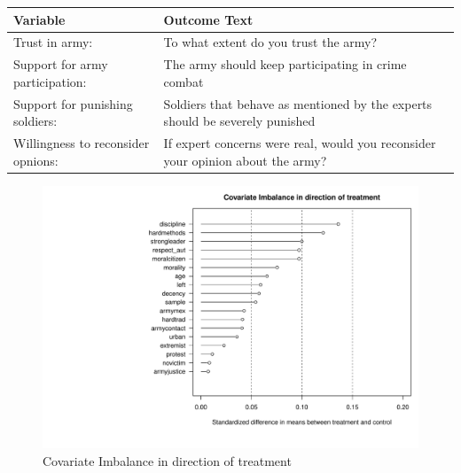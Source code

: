 \documentclass[
  12pt,
]{article}
\begin{document}
\begin{longtable}[]{@{}ll@{}}
\toprule
\begin{minipage}[b]{0.29\columnwidth}\raggedright
Variable\strut
\end{minipage} & \begin{minipage}[b]{0.65\columnwidth}\raggedright
Outcome Text\strut
\end{minipage}\tabularnewline
\midrule
\endhead
\begin{minipage}[t]{0.29\columnwidth}\raggedright
Trust in army:\strut
\end{minipage} & \begin{minipage}[t]{0.65\columnwidth}\raggedright
To what extent do you trust the army?\strut
\end{minipage}\tabularnewline
\begin{minipage}[t]{0.29\columnwidth}\raggedright
Support for army participation:\strut
\end{minipage} & \begin{minipage}[t]{0.65\columnwidth}\raggedright
The army should keep participating in crime combat\strut
\end{minipage}\tabularnewline
\begin{minipage}[t]{0.29\columnwidth}\raggedright
Support for punishing soldiers:\strut
\end{minipage} & \begin{minipage}[t]{0.65\columnwidth}\raggedright
Soldiers that behave as mentioned by the experts should be severely
punished\strut
\end{minipage}\tabularnewline
\begin{minipage}[t]{0.29\columnwidth}\raggedright
Willingness to reconsider opnions:\strut
\end{minipage} & \begin{minipage}[t]{0.65\columnwidth}\raggedright
If expert concerns were real, would you reconsider your opinion about
the army?\strut
\end{minipage}\tabularnewline
\bottomrule
\end{longtable}

\begin{figure}
\centering
\includegraphics{marko-oliver_final-proj_files/figure-latex/unnamed-chunk-4-1.pdf}
\caption{Covariate Imbalance in direction of treatment}
\end{figure}
\end{document}
